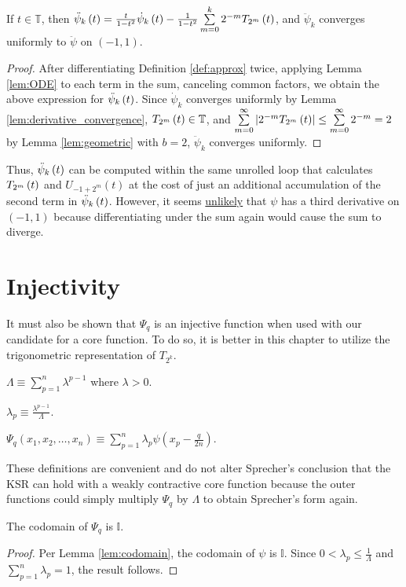 \begin{lemma}
  \label{lem:second_derivative}
  \leanok
  If $t \in \mathbb{T}$, then $\ddot{\psi}_{k}\left(t\right) = \frac{t}{1 - t^2} \dot{\psi}_{k}\left(t\right) - \frac{1}{1 - t^2} \sum\limits_{m = 0}^k 2^{-m} T_{2^{m}}\left(t\right)$, and $\ddot{\psi}_k$ converges uniformly to $\ddot{\psi}$ on $\left(-1,1\right)$.
\end{lemma}
\begin{proof}
  \leanok
  After differentiating Definition \ref{def:approx} twice, applying Lemma \ref{lem:ODE} to each term in the sum, canceling common factors, we obtain the above expression for $\ddot{\psi}_{k}\left(t\right)$. Since $\dot{\psi}_k$ converges uniformly by Lemma \ref{lem:derivative_convergence}, $T_{2^{m}}\left(t\right) \in \mathbb{T}$, and $\sum\limits_{m = 0}^\infty \left|2^{-m} T_{2^{m}}\left(t\right)\right| \leq \sum\limits_{m = 0}^\infty 2^{-m} = 2$ by Lemma \ref{lem:geometric} with $b = 2$, $\ddot{\psi}_k$ converges uniformly.
 \end{proof}
\noindent Thus, $\ddot{\psi}_{k}\left(t\right)$ can be computed within the same unrolled loop that calculates $T_{2^{m}}\left(t\right)$ and $U_{-1 + 2^m}\left(t\right)$ at the cost of just an additional accumulation of the second term in $\ddot{\psi}_{k}\left(t\right)$. However, it seems \underline{unlikely} that $\psi$ has a third derivative on $\left(-1,1\right)$ because differentiating under the sum again would cause the sum to diverge.

\chapter{Injectivity}\label{ch:Injectivity}
It must also be shown that $\Psi_q$ is an injective function when used with our candidate for a core function. To do so, it is better in this chapter to utilize the trigonometric representation of $T_{2^k}$.
\begin{definition}[Normalizer]
  \label{def:Lambda}
  $\Lambda \equiv \sum\limits_{p = 1}^n \lambda^{p - 1}$ where $\lambda > 0$.
\end{definition}
\begin{definition}
  \label{def:lambda_p}
  $\lambda_p \equiv \frac{\lambda^{p - 1}}{\Lambda}$.
\end{definition}
\begin{definition}
  \label{def:Psi}
  $\Psi_q\left(x_1, x_2, \dots, x_n\right) \equiv \sum\limits_{p = 1}^n \lambda_p \psi\left(x_p - \frac{q}{2n}\right)$.
\end{definition}
\noindent These definitions are convenient and do not alter Sprecher's conclusion that the KSR can hold with a weakly contractive core function because the outer functions could simply multiply $\Psi_q$ by $\Lambda$ to obtain Sprecher's form again.
\begin{lemma}
  \label{lem:Psi_q_codomain}
  \leanok
  The codomain of $\Psi_q$ is $\mathbb{I}$.
\end{lemma}
\begin{proof}
  \leanok
  Per Lemma \ref{lem:codomain}, the codomain of $\psi$ is $\mathbb{I}$. Since $0 < \lambda_p \leq \frac{1}{\Lambda}$ and $\sum\limits_{p = 1}^n \lambda_p = 1$, the result follows.
\end{proof}

